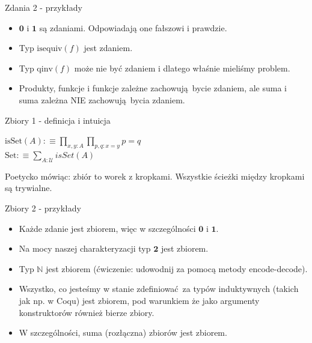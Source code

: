 \documentclass{beamer}
\newcommand{\defn}{:\equiv}
\newcommand{\U}{\mathcal{U}}
\newcommand{\qinv}{\text{qinv}}
\newcommand{\isequiv}{\text{isequiv}}
\newcommand{\isSet}{\text{isSet}}
\newcommand{\Set}{\text{Set}}
\begin{document}
\begin{frame}{Zdania 2 - przykłady}
\begin{itemize}
	\item $\mathbf{0}$ i $\mathbf{1}$ są zdaniami. Odpowiadają one fałszowi i prawdzie.
	\item Typ $\isequiv(f)$ jest zdaniem.
	\item Typ $\qinv(f)$ może nie być zdaniem i dlatego właśnie mieliśmy problem.
	\item Produkty, funkcje i funkcje zależne zachowują bycie zdaniem, ale suma i suma zależna NIE zachowują bycia zdaniem.
\end{itemize}
\end{frame}

\begin{frame}{Zbiory 1 - definicja i intuicja}

\begin{definition}[Zbiór]
$\isSet(A) \defn \prod_{x, y : A} \prod_{p, q : x = y} p = q$ \\
$\Set \defn \sum_{A : \U} isSet(A)$
\end{definition}

Poetycko mówiąc: zbiór to worek z kropkami. Wszystkie ścieżki między kropkami są trywialne.

\end{frame}

\begin{frame}{Zbiory 2 - przykłady}
\begin{itemize}
	\item Każde zdanie jest zbiorem, więc w szczególności $\mathbf{0}$ i $\mathbf{1}$.
	\item Na mocy naszej charakteryzacji typ $\mathbf{2}$ jest zbiorem.
	\item Typ $\mathbb{N}$ jest zbiorem (ćwiczenie: udowodnij za pomocą metody encode-decode).
	\item Wszystko, co jesteśmy w stanie zdefiniować za typów induktywnych (takich jak np. w Coqu) jest zbiorem, pod warunkiem że jako argumenty konstruktorów również bierze zbiory.
	\item W szczególności, suma (rozłączna) zbiorów jest zbiorem.
\end{itemize}
\end{frame}
\end{document}
